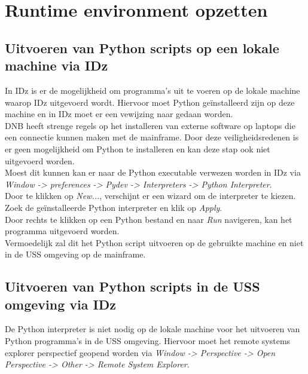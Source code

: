 
\chapter{Runtime environment opzetten}
\label{ch:runtime-environment}
\section{Uitvoeren van Python scripts op een lokale machine via IDz}
In IDz is er de mogelijkheid om programma's uit te voeren op de lokale machine waarop IDz uitgevoerd wordt. Hiervoor moet Python geïnstalleerd zijn op deze machine en in IDz moet er een vewijzing naar gedaan worden. \\

DNB heeft strenge regels op het installeren van externe software op laptops die een connectie kunnen maken met de mainframe. Door deze veiligheidsredenen is er geen mogelijkheid om Python te installeren en kan deze stap ook niet uitgevoerd worden. \\

Moest dit kunnen kan er naar de Python executable verwezen worden in IDz via \textit{Window -> preferences -> Pydev -> Interpreters -> Python Interpreter}. \\
Door te klikken op \textit{New...}, verschijnt er een wizard om de interpreter te kiezen. Zoek de geïnstalleerde Python interpreter en klik op \textit{Apply}. \\

Door rechts te klikken op een Python bestand en naar \textit{Run} navigeren, kan het programma uitgevoerd worden. \\
Vermoedelijk zal dit het Python script uitvoeren op de gebruikte machine en niet in de USS omgeving op de mainframe. 


\section{Uitvoeren van Python scripts in de USS omgeving via IDz}
De Python interpreter is niet nodig op de lokale machine voor het uitvoeren van Python programma's in de USS omgeving. Hiervoor moet het remote systems explorer perspectief geopend worden via \textit{Window -> Perspective -> Open Perspective -> Other -> Remote System Explorer}. \\

